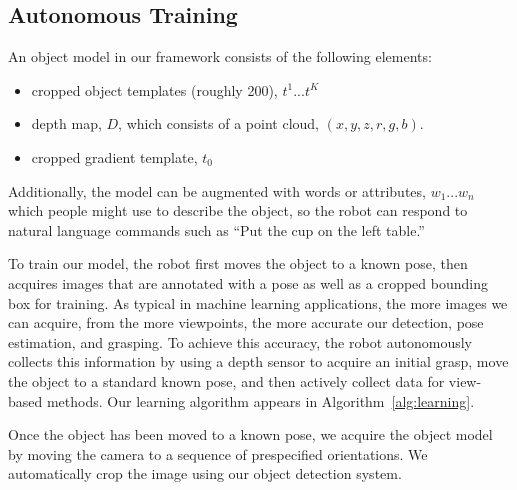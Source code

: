 \documentclass{article}
\begin{document}
\subsection{Autonomous Training}
\label{sec:training}

An object model in our framework consists of the following elements:
\begin{itemize}
\item cropped object templates (roughly 200), $t^1 ... t^K$
\item depth map, $D$, which consists of a point cloud, $(x, y, z, r, g, b)$.
\item cropped gradient template, $t_0$
\end{itemize}

Additionally, the model can be augmented with words or attributes,
$w_1... w_n$ which people might use to describe the object, so the
robot can respond to natural language commands such as ``Put the cup
on the left table.''

To train our model, the robot first moves the object to a known pose,
then acquires images that are annotated with a pose as well as a
cropped bounding box for training.  As typical in machine learning
applications, the more images we can acquire, from the more
viewpoints, the more accurate our detection, pose estimation, and
grasping.  To achieve this accuracy, the robot autonomously collects
this information by using a depth sensor to acquire an initial grasp,
move the object to a standard known pose, and then actively collect
data for view-based methods.  Our learning algorithm appears in
Algorithm~\ref{alg:learning}.

Once the object has been moved to a known pose, we acquire the object
model by moving the camera to a sequence of prespecified orientations.
We automatically crop the image using our object detection system.




\end{document}

